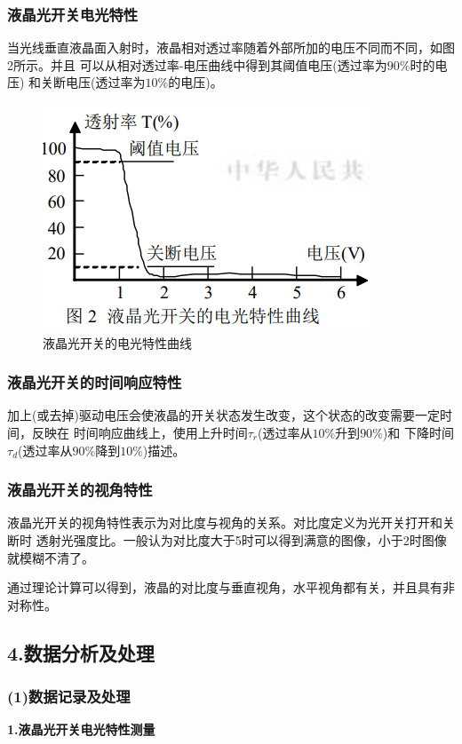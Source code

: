 \documentclass[utf8]{ctexart}
\begin{document}
	\subsubsection*{液晶光开关电光特性}
	当光线垂直液晶面入射时，液晶相对透过率随着外部所加的电压不同而不同，如图2所示。并且
	可以从相对透过率-电压曲线中得到其阈值电压(透过率为$90\%$时的电压)
	和关断电压(透过率为$10\%$的电压)。
	\begin{figure}[htbp]
		\centering
		\includegraphics[scale=0.7]{2.png}
		\caption{液晶光开关的电光特性曲线}
	\end{figure}

	\subsubsection*{液晶光开关的时间响应特性}
	加上(或去掉)驱动电压会使液晶的开关状态发生改变，这个状态的改变需要一定时间，反映在
	时间响应曲线上，使用上升时间$\tau_r$(透过率从$10\%$升到$90\%$)和
	下降时间$\tau_d$(透过率从$90\%$降到$10\%$)描述。

	\subsubsection*{液晶光开关的视角特性}
	液晶光开关的视角特性表示为对比度与视角的关系。对比度定义为光开关打开和关断时
	透射光强度比。一般认为对比度大于5时可以得到满意的图像，小于2时图像就模糊不清了。

	通过理论计算可以得到，液晶的对比度与垂直视角，水平视角都有关，并且具有非对称性。

	
	\subsection*{4.数据分析及处理}
	\subsubsection*{(1)数据记录及处理}
	\textbf{1.液晶光开关电光特性测量}
\end{document}

